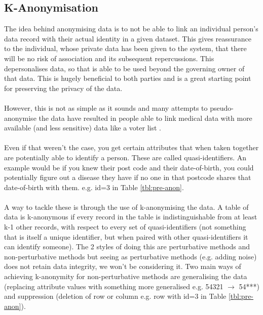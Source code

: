 \subsection{K-Anonymisation}
The idea behind anonymising data is to not be able to link an individual person's data record with their actual identity in a given dataset. This gives reassurance to the individual, whose private data has been given to the system, that there will be no risk of association and its subsequent repercussions. This depersonalises data, so that is able to be used beyond the governing owner of that data. 
This is hugely beneficial to both parties and is a great starting point for preserving the privacy of the data. 
\\ \\
However, this is not as simple as it sounds and many attempts to pseudo-anonymise the data have resulted in people able to link medical data with more available (and less sensitive) data like a voter list \cite{failed_anonymisation}.
\\ \\
Even if that weren't the case, you get certain attributes that when taken together are potentially able to identify a person. These are called quasi-identifiers. 
An example would be if you knew their post code and their date-of-birth, you could potentially figure out a disease they have if no one in that postcode shares that date-of-birth with them. e.g. id=3 in Table \ref{tbl:pre-anon}.
\\ \\
A way to tackle these is through the use of k-anonymising the data. A table of data is k-anonymous if every record in the table is indistinguishable from at least k-1 other records, with respect to every set of quasi-identifiers (not something that is itself a unique identifier, but when paired with other quasi-identifiers it can identify someone). 
The 2 styles of doing this are perturbative methods and non-perturbative methods but seeing as perturbative methods (e.g. adding noise) does not retain data integrity, we won't be considering it. 
Two main ways of achieving k-anonymity for non-perturbative methods are generalising the data (replacing attribute values with something more generalised e.g. 54321 $\longrightarrow$ 54***) and suppression (deletion of row or column e.g. row with id=3 in Table \ref{tbl:pre-anon}).
